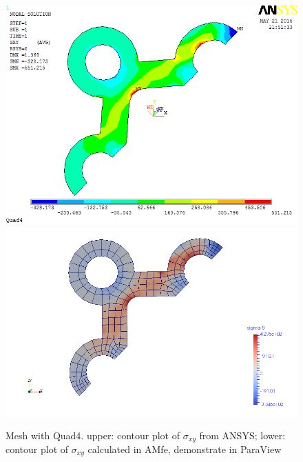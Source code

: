 \begin{figure}[htbp]
	\begin{center}
		\includegraphics[width=13cm,clip]{Quad4_Sxy.png} 		
		\includegraphics[width=13cm,clip]{Quad4_Sxy_P.png} 		
		\caption{Mesh with Quad4. upper: contour plot of $\sigma_{xy}$ from ANSYS; lower: contour plot of $\sigma_{xy}$ calculated in AMfe, demonstrate in ParaView} \label{fig: Quad4_Sxy}
	\end{center}
\end{figure}

